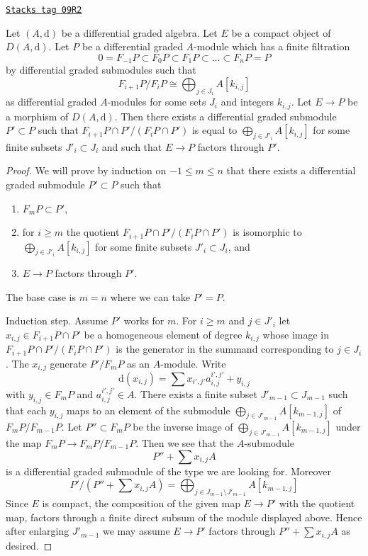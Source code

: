 \begin{lemma}
\label{dga-lemma-factor-through-nicer}
\href{https://stacks.math.columbia.edu/tag/09R2}{\texttt{Stacks tag 09R2}}

Let $(A, \text{d})$ be a differential graded algebra. Let $E$ be a compact
object of $D(A, \text{d})$. Let $P$ be a differential graded $A$-module
which has a finite filtration
$$
0 = F_{-1}P \subset F_0P \subset F_1P \subset \ldots \subset F_nP = P
$$
by differential graded submodules such that
$$
F_{i + 1}P/F_iP \cong \bigoplus\nolimits_{j \in J_i} A[k_{i, j}]
$$
as differential graded $A$-modules for some sets $J_i$ and integers $k_{i, j}$.
Let $E \to P$ be a morphism of $D(A, \text{d})$.
Then there exists a differential graded submodule $P' \subset P$ such that
$F_{i + 1}P \cap P'/(F_iP \cap P')$ is equal to
$\bigoplus_{j \in J'_i} A[k_{i, j}]$ for some finite subsets
$J'_i \subset J_i$ and such that $E \to P$ factors through $P'$.
\end{lemma}

\begin{proof}
We will prove by induction on $-1 \leq m \leq n$ that there exists
a differential graded submodule $P' \subset P$  such that
\begin{enumerate}
\item $F_mP \subset P'$,
\item for $i \geq m$ the quotient $F_{i + 1}P \cap P'/(F_iP \cap P')$ is
isomorphic to $\bigoplus_{j \in J'_i} A[k_{i, j}]$ for some finite subsets
$J'_i \subset J_i$, and
\item $E \to P$ factors through $P'$.
\end{enumerate}
The base case is $m = n$ where we can take $P' = P$.

\medskip\noindent
Induction step. Assume $P'$ works for $m$.
For $i \geq m$ and $j \in J'_i$ let $x_{i, j} \in F_{i + 1}P \cap P'$
be a homogeneous element of degree $k_{i, j}$ whose image in
$F_{i + 1}P \cap P'/(F_iP \cap P')$ is the generator in
the summand corresponding to $j \in J_i$. The
$x_{i, j}$ generate $P'/F_mP$ as an $A$-module. Write
$$
\text{d}(x_{i, j}) = \sum x_{i', j'} a_{i, j}^{i', j'} + y_{i, j}
$$
with $y_{i, j} \in F_mP$ and $a_{i, j}^{i', j'} \in A$.
There exists a finite subset
$J'_{m - 1} \subset J_{m - 1}$ such that each $y_{i, j}$ maps to
an element of the submodule $\bigoplus_{j \in J'_{m - 1}} A[k_{m - 1, j}]$
of $F_mP/F_{m - 1}P$. Let $P'' \subset F_mP$ be the inverse
image of $\bigoplus_{j \in J'_{m - 1}} A[k_{m - 1, j}]$ under
the map $F_mP \to F_mP/F_{m - 1}P$. Then we see that the $A$-submodule
$$
P'' + \sum x_{i, j}A
$$
is a differential graded submodule of the type we are looking for. Moreover
$$
P'/(P'' + \sum x_{i, j}A) =
\bigoplus\nolimits_{j \in J_{m - 1} \setminus J'_{m - 1}} A[k_{m - 1, j}]
$$
Since $E$ is compact, the composition of the given map $E \to P'$
with the quotient map, factors through a finite direct subsum of
the module displayed above. Hence after enlarging $J'_{m - 1}$
we may assume $E \to P'$ factors through
$P'' + \sum x_{i, j}A$ as desired.
\end{proof}

